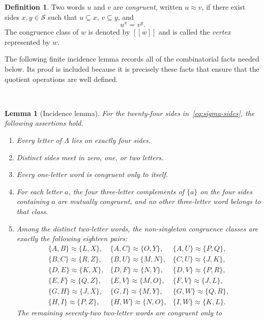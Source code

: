 \documentclass{article}   	%
\theoremstyle{plain}
\newtheorem{lemma}[theorem]{Lemma}
\theoremstyle{definition}
\newtheorem{definition}[theorem]{Definition}
\theoremstyle{remark}
\begin{document}
\begin{definition}
\label{def:cong}
Two words $u$ and $v$ are \emph{congruent}, written $u\approx v$, if there
exist sides $x,y\in\mathcal S$ such that $u\subseteq x$, $v\subseteq y$, and
\[
u^x=v^y.
\]
The congruence class of $w$ is denoted by $[[w]]$ and is called the
\emph{vertex} represented by $w$.
\end{definition}

The following finite incidence lemma records all of the combinatorial facts
needed below.  Its proof is included because it is precisely these facts that
ensure that the quotient operations are well defined.

\

\begin{lemma}[Incidence lemma]
\label{lem:sigma-incidence}
For the twenty-four sides in~\eqref{eq:sigma-sides}, the following assertions
hold.
\begin{enumerate}
\item Every letter of $\Lambda$ lies on exactly four sides.
\item Distinct sides meet in zero, one, or two letters.
\item Every one-letter word is congruent only to itself.
\item For each letter $a$, the four three-letter complements of $\{a\}$ on
      the four sides containing $a$ are mutually congruent, and no other
      three-letter word belongs to that class.
\item Among the distinct two-letter words, the non-singleton congruence
      classes are exactly the following eighteen pairs:
      \[
      \begin{array}{lll}
      \{A,B\}\approx\{L,X\}, &
      \{A,C\}\approx\{O,Y\}, &
      \{A,U\}\approx\{P,Q\},\\
      \{B,C\}\approx\{R,Z\}, &
      \{B,U\}\approx\{M,N\}, &
      \{C,U\}\approx\{J,K\},\\
      \{D,E\}\approx\{K,X\}, &
      \{D,F\}\approx\{N,Y\}, &
      \{D,V\}\approx\{P,R\},\\
      \{E,F\}\approx\{Q,Z\}, &
      \{E,V\}\approx\{M,O\}, &
      \{F,V\}\approx\{J,L\},\\
      \{G,H\}\approx\{J,X\}, &
      \{G,I\}\approx\{M,Y\}, &
      \{G,W\}\approx\{Q,R\},\\
      \{H,I\}\approx\{P,Z\}, &
      \{H,W\}\approx\{N,O\}, &
      \{I,W\}\approx\{K,L\}.
      \end{array}
      \]
      The remaining seventy-two two-letter words are congruent only to

\end{enumerate}
\end{lemma}
\end{document}
